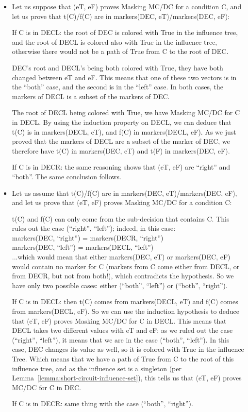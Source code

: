 \documentclass[a4paper,12pt,twoside]{article}
\begin{document}
\begin{itemize}

\item Let us suppose that (eT, eF) proves Masking MC/DC for a condition C,
and let us prove that t(C)/f(C) are in markers(DEC, eT)/markers(DEC, eF):

If C is in DECL: the root of DEC is colored with True in the influence tree,
and the root of DECL is colored also with True in the influence
tree, otherwise there would not be a path of True from C to the root of DEC.

DEC's root and DECL's being both colored with True, they have both changed
between eT and eF. This means that one of these two vectors is in the
``both'' case, and the second is in the ``left'' case. In both cases,
the markers of DECL is a subset of the markers of DEC.

The root of DECL being colored with True, we have Masking MC/DC for C
in DECL. By using the induction property on DECL, we can deduce that
t(C) is in markers(DECL, eT), and f(C) in markers(DECL, eF). As we just
proved that the markers of DECL are a subset of the marker of DEC, we
therefore have t(C) in markers(DEC, eT) and t(F) in markers(DEC, eF).

If C is in DECR: the same reasoning shows that (eT, eF) are ``right''
and ``both''.  The same conclusion follows.

\item Let us assume that t(C)/f(C) are in markers(DEC, eT)/markers(DEC, eF),
and let us prove that (eT, eF) proves Masking MC/DC for a condition C:

t(C) and f(C) can only come from the sub-decision that contains C.
This rules out the case (``right'', ``left''); indeed, in this case:\\
 markers(DEC, ``right'') = markers(DECR, ``right'')\\
 markers(DEC, ``left'')  = markers(DECL, ``left'')\\
...which would mean that either markers(DEC, eT) or markers(DEC, eF)
would contain no marker for C (markers from C come either from DECL,
or from DECR, but not from both!), which contradicts the hypothesis.
So we have only two possible cases: either (``both'', ``left'') or
(``both'', ``right'').

If C is in DECL: then t(C) comes from markers(DECL, eT) and f(C) comes
from markers(DECL, eF). So we can use the induction hypothesis to
deduce that (eT, eF) proves Masking MC/DC for C in DECL. This
means that DECL takes two different values with eT and eF; as
we ruled out the case (``right'', ``left''), it means that we are
in the case (``both'', ``left''). In this case, DEC changes its value
as well, so it is colored with True in the influence Tree. Which
means that we have a path of True from C to the root of this
influence tree, and as the influence set is a singleton (per
Lemma~\ref{lemma:short-circuit-influence-set}), this tells us
that (eT, eF) proves MC/DC for C in DEC.

If C is in DECR: same thing with the case (``both'', ``right'').

\end{itemize}
\end{document}
